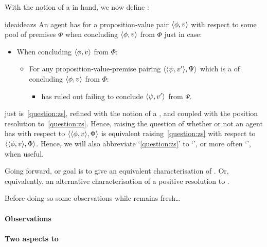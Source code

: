 \begin{note}
  With the notion of a \requ{} in hand, we now define :

  \begin{restatable}[\zsN{2} --- \zs{}]{idea}{ideazs}
    \label{idea:zs}
    An agent \vAgent{} has \emph{\zsAb{-}} for a proposition-value pair \(\langle \phi, v \rangle\) with respect to some pool of premises \(\Phi\) when concluding \(\langle \phi, v \rangle\) from \(\Phi\) just in case:
    \begin{itemize}
    \item
      When concluding \(\langle \phi, v \rangle\) from \(\Phi\):
      \begin{itemize}
      \item
        For any proposition-value-premise pairing \(\langle \langle \psi, v' \rangle, \Psi \rangle\) which is a \requ{} of concluding \(\langle \phi, v \rangle\) from \(\Phi\):
        \begin{itemize}
        \item
          \vAgent{} has ruled out failing to conclude \(\langle \psi, v' \rangle\) from \(\Psi\).
        \end{itemize}
      \end{itemize}
    \end{itemize}
    \vspace{-\baselineskip}
  \end{restatable}

   just is~\autoref{question:zs}, refined with the notion of a \requ{}, and coupled with the position resolution to~\autoref{question:zs}.
  Hence, raising the question of whether or not an agent has \zs{} with respect to \(\langle \langle \phi, v \rangle, \Phi \rangle\) is equivalent raising~\autoref{question:zs} with respect to \(\langle \langle \phi, v \rangle, \Phi \rangle\).
  Hence, we will also abbreviate `\autoref{question:zs}' to `\qzs{-}', or more often `\qzs{}', when useful.

  Going forward, or goal is to give an equivalent characterisation of \zs{}.
  Or, equivalently, an alternative characterisation of a positive resolution to \qzs{}.

  {
    \color{red}
    Before doing so some observations while \qzs{} remains fresh\dots
  }
\end{note}

\paragraph*{Observations}

\paragraph*{Two aspects to \zs{}}

